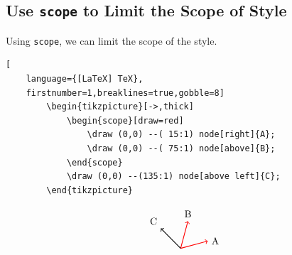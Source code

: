 \documentclass[lualatex]{jlreq}
\begin{document}
\subsection{Use \texttt{scope} to Limit the Scope of Style}

Using \verb|scope|, we can limit the scope of the style.
\\[1em]
\begin{minipage}{0.78 \textwidth}
    \begin{lstlisting}[
    language={[LaTeX] TeX},
    firstnumber=1,breaklines=true,gobble=8]
        \begin{tikzpicture}[->,thick]
            \begin{scope}[draw=red]
                \draw (0,0) --( 15:1) node[right]{A};
                \draw (0,0) --( 75:1) node[above]{B};
            \end{scope}
            \draw (0,0) --(135:1) node[above left]{C};
        \end{tikzpicture}
    \end{lstlisting}
\end{minipage}
\hfill
\begin{minipage}{0.18 \textwidth}
    \[
        \begin{tikzpicture}[->,thick]
            \begin{scope}[draw=red]
                \draw (0,0) --( 15:1) node[right]{A};
                \draw (0,0) --( 75:1) node[above]{B};
            \end{scope}
            \draw (0,0) --(135:1) node[above left]{C};
        \end{tikzpicture}
    \]
\end{minipage}
\\[1em]
\end{document}
